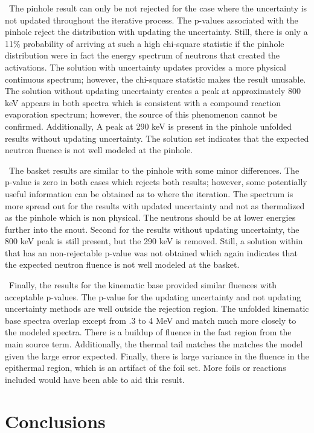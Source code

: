 \documentclass[journal]{IEEEtran}
\begin{document}
\ The pinhole result can only be not rejected for the case where the uncertainty is not updated throughout the iterative process. The p-values associated with the pinhole reject the distribution with updating the uncertainty. Still, there is only a 11\% probability of arriving at such a high chi-square statistic if the pinhole distribution were in fact the energy spectrum of neutrons that created the activations. The solution with uncertainty updates provides a more physical continuous spectrum; however, the chi-square statistic makes the result unusable. The solution without updating uncertainty creates a peak at approximately 800 keV appears in both spectra which is consistent with a compound reaction evaporation spectrum; however, the source of this phenomenon cannot be confirmed. Additionally, A peak at 290 keV is present in the pinhole unfolded results without updating uncertainty. The solution set indicates that the expected neutron fluence is not well modeled at the pinhole. 

\ The basket results are similar to the pinhole with some minor differences. The p-value is zero in both cases which rejects both results; however, some potentially useful information can be obtained as to where the iteration. The spectrum is more spread out for the results with updated uncertainty and not as thermalized as the pinhole which is non physical. The neutrons should be at lower energies further into the snout. Second for the results without updating uncertainty, the 800 keV peak is still present, but the 290 keV is removed. Still, a solution within that has an non-rejectable p-value was not obtained which again indicates that the expected neutron fluence is not well modeled at the basket. 

\ Finally, the results for the kinematic base provided similar fluences with acceptable p-values. The p-value for the updating uncertainty and not updating uncertainty methods are well outside the rejection region. The unfolded kinematic base spectra overlap except from .3 to 4 MeV and match much more closely to the modeled spectra. There is a buildup of fluence in the fast region from the main source term. Additionally, the thermal tail matches the matches the model given the large error expected. Finally, there is large variance in the fluence in the epithermal region, which is an artifact of the foil set. More foils or reactions included would have been able to aid this result. 

\section{Conclusions}
\end{document}
